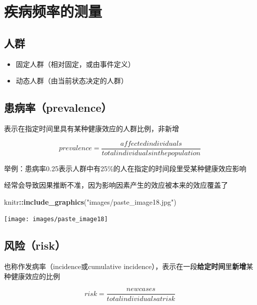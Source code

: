 \documentclass[
]{book}
\newenvironment{Shaded}{\begin{snugshade}}{\end{snugshade}}
\newcommand{\KeywordTok}[1]{\textcolor[rgb]{0.13,0.29,0.53}{\textbf{#1}}}
\newcommand{\NormalTok}[1]{#1}
\newcommand{\OperatorTok}[1]{\textcolor[rgb]{0.81,0.36,0.00}{\textbf{#1}}}
\newcommand{\StringTok}[1]{\textcolor[rgb]{0.31,0.60,0.02}{#1}}
\providecommand{\tightlist}{%
  \setlength{\itemsep}{0pt}\setlength{\parskip}{0pt}}
\begin{document}
\hypertarget{ux75beux75c5ux9891ux7387ux7684ux6d4bux91cf}{%
\section{疾病频率的测量}\label{ux75beux75c5ux9891ux7387ux7684ux6d4bux91cf}}

\hypertarget{ux4ebaux7fa4}{%
\subsection{人群}\label{ux4ebaux7fa4}}

\begin{itemize}
\tightlist
\item
  固定人群（相对固定，或由事件定义）
\item
  动态人群（由当前状态决定的人群）
\end{itemize}

\hypertarget{ux60a3ux75c5ux7387prevalence}{%
\subsection{患病率（prevalence）}\label{ux60a3ux75c5ux7387prevalence}}

表示在指定时间里具有某种健康效应的人群比例，非新增

\[prevalence = \frac{affected individuals}{total individuals in the population}\]

举例：患病率0.25表示人群中有25\%的人在指定的时间段里受某种健康效应影响

经常会导致因果推断不准，因为影响因素产生的效应被本来的效应覆盖了

\begin{Shaded}
\begin{Highlighting}[]
\NormalTok{knitr}\OperatorTok{::}\KeywordTok{include_graphics}\NormalTok{(}\StringTok{"images/paste_image18.jpg"}\NormalTok{)}
\end{Highlighting}
\end{Shaded}

\texttt{[image: images/paste\_image18]}

\hypertarget{ux98ceux9669risk}{%
\subsection{风险（risk）}\label{ux98ceux9669risk}}

也称作发病率（incidence或cumulative incidence），表示在一段\textbf{给定时间}里\textbf{新增}某种健康效应的比例

\[risk = \frac{new cases}{total individuals at risk}\]
\end{document}
